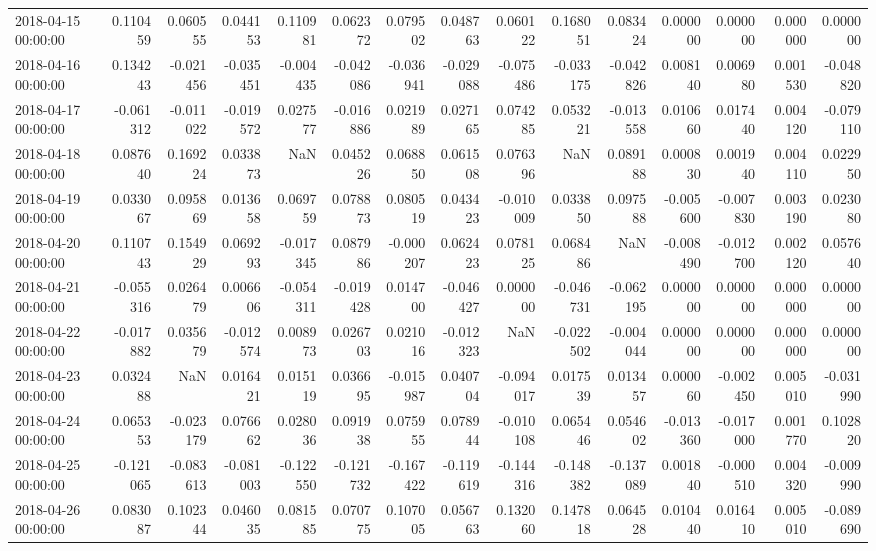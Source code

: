 \begin{tabular}{lrrrrrrrrrrrrrr}
2018-04-15 00:00:00 & 0.110459 & 0.060555 & 0.044153 & 0.110981 & 0.062372 & 0.079502 & 0.048763 & 0.060122 & 0.168051 & 0.083424 & 0.000000 & 0.000000 & 0.000000 & 0.000000 \\
2018-04-16 00:00:00 & 0.134243 & -0.021456 & -0.035451 & -0.004435 & -0.042086 & -0.036941 & -0.029088 & -0.075486 & -0.033175 & -0.042826 & 0.008140 & 0.006980 & 0.001530 & -0.048820 \\
2018-04-17 00:00:00 & -0.061312 & -0.011022 & -0.019572 & 0.027577 & -0.016886 & 0.021989 & 0.027165 & 0.074285 & 0.053221 & -0.013558 & 0.010660 & 0.017440 & 0.004120 & -0.079110 \\
2018-04-18 00:00:00 & 0.087640 & 0.169224 & 0.033873 & NaN & 0.045226 & 0.068850 & 0.061508 & 0.076396 & NaN & 0.089188 & 0.000830 & 0.001940 & 0.004110 & 0.022950 \\
2018-04-19 00:00:00 & 0.033067 & 0.095869 & 0.013658 & 0.069759 & 0.078873 & 0.080519 & 0.043423 & -0.010009 & 0.033850 & 0.097588 & -0.005600 & -0.007830 & 0.003190 & 0.023080 \\
2018-04-20 00:00:00 & 0.110743 & 0.154929 & 0.069293 & -0.017345 & 0.087986 & -0.000207 & 0.062423 & 0.078125 & 0.068486 & NaN & -0.008490 & -0.012700 & 0.002120 & 0.057640 \\
2018-04-21 00:00:00 & -0.055316 & 0.026479 & 0.006606 & -0.054311 & -0.019428 & 0.014700 & -0.046427 & 0.000000 & -0.046731 & -0.062195 & 0.000000 & 0.000000 & 0.000000 & 0.000000 \\
2018-04-22 00:00:00 & -0.017882 & 0.035679 & -0.012574 & 0.008973 & 0.026703 & 0.021016 & -0.012323 & NaN & -0.022502 & -0.004044 & 0.000000 & 0.000000 & 0.000000 & 0.000000 \\
2018-04-23 00:00:00 & 0.032488 & NaN & 0.016421 & 0.015119 & 0.036695 & -0.015987 & 0.040704 & -0.094017 & 0.017539 & 0.013457 & 0.000060 & -0.002450 & 0.005010 & -0.031990 \\
2018-04-24 00:00:00 & 0.065353 & -0.023179 & 0.076662 & 0.028036 & 0.091938 & 0.075955 & 0.078944 & -0.010108 & 0.065446 & 0.054602 & -0.013360 & -0.017000 & 0.001770 & 0.102820 \\
2018-04-25 00:00:00 & -0.121065 & -0.083613 & -0.081003 & -0.122550 & -0.121732 & -0.167422 & -0.119619 & -0.144316 & -0.148382 & -0.137089 & 0.001840 & -0.000510 & 0.004320 & -0.009990 \\
2018-04-26 00:00:00 & 0.083087 & 0.102344 & 0.046035 & 0.081585 & 0.070775 & 0.107005 & 0.056763 & 0.132060 & 0.147818 & 0.064528 & 0.010440 & 0.016410 & 0.005010 & -0.089690 \\

\end{tabular}
